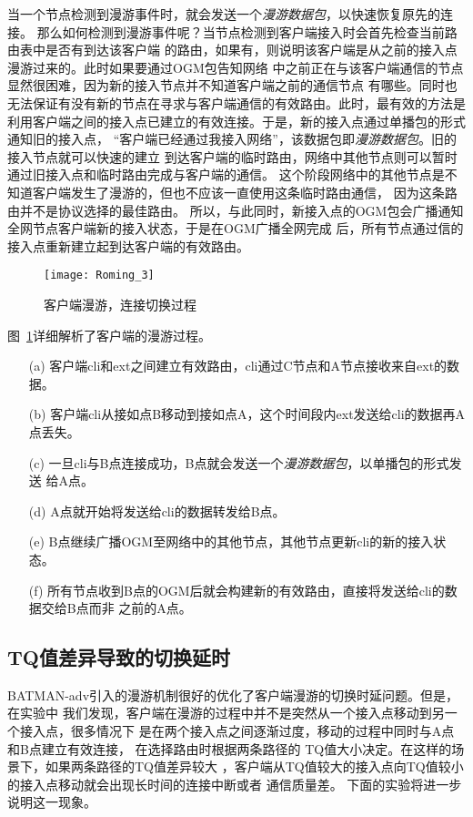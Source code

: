 当一个节点检测到漫游事件时，就会发送一个\emph{漫游数据包}，以快速恢复原先的连接。
那么如何检测到漫游事件呢？当节点检测到客户端接入时会首先检查当前路由表中是否有到达该客户端
的路由，如果有，则说明该客户端是从之前的接入点漫游过来的。此时如果要通过OGM包告知网络
中之前正在与该客户端通信的节点显然很困难，因为新的接入节点并不知道客户端之前的通信节点
有哪些。同时也无法保证有没有新的节点在寻求与客户端通信的有效路由。此时，最有效的方法是
利用客户端之间的接入点已建立的有效连接。于是，新的接入点通过单播包的形式通知旧的接入点，
“客户端已经通过我接入网络”，该数据包即\emph{漫游数据包}。旧的接入节点就可以快速的建立
到达客户端的临时路由，网络中其他节点则可以暂时通过旧接入点和临时路由完成与客户端的通信。
这个阶段网络中的其他节点是不知道客户端发生了漫游的，但也不应该一直使用这条临时路由通信，
因为这条路由并不是协议选择的最佳路由。
所以，与此同时，新接入点的OGM包会广播通知全网节点客户端新的接入状态，于是在OGM广播全网完成
后，所有节点通过信的接入点重新建立起到达客户端的有效路由。

\begin{figure}[H] %
  \centering
  \texttt{[image: Roming\_3]}
  \caption{客户端漫游，连接切换过程}
  \label{fig:roming_3}
\end{figure}

图~\ref{fig:roming_3}详细解析了客户端的漫游过程。
\begin{itemize}
\item[(a)] 客户端cli和ext之间建立有效路由，cli通过C节点和A节点接收来自ext的数据。
\item[(b)] 客户端cli从接如点B移动到接如点A，这个时间段内ext发送给cli的数据再A点丢失。
\item[(c)] 一旦cli与B点连接成功，B点就会发送一个\emph{漫游数据包}，以单播包的形式发送
给A点。
\item[(d)] A点就开始将发送给cli的数据转发给B点。
\item[(e)] B点继续广播OGM至网络中的其他节点，其他节点更新cli的新的接入状态。
\item[(f)] 所有节点收到B点的OGM后就会构建新的有效路由，直接将发送给cli的数据交给B点而非
之前的A点。
\end{itemize}

\subsection{TQ值差异导致的切换延时}
BATMAN-adv引入的漫游机制很好的优化了客户端漫游的切换时延问题。但是，在实验中
我们发现，客户端在漫游的过程中并不是突然从一个接入点移动到另一个接入点，很多情况下
是在两个接入点之间逐渐过度，移动的过程中同时与A点和B点建立有效连接，
在选择路由时根据两条路径的
TQ值大小决定。在这样的场景下，如果两条路径的TQ值差异较大
，客户端从TQ值较大的接入点向TQ值较小的接入点移动就会出现长时间的连接中断或者
通信质量差。
下面的实验将进一步说明这一现象。

